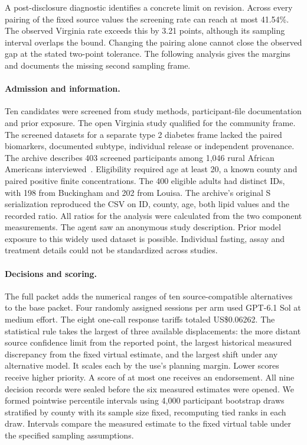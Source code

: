 A post-disclosure diagnostic identifies a concrete limit on revision. Across every pairing of the fixed source values the screening rate can reach at most 41.54\%. The observed Virginia rate exceeds this by 3.21 points, although its sampling interval overlaps the bound. Changing the pairing alone cannot close the observed gap at the stated two-point tolerance. The following analysis gives the margins and documents the missing second sampling frame.

\paragraph{Admission and information.}
Ten candidates were screened from study methods, participant-file documentation and prior exposure. The open Virginia study qualified for the community frame. The screened datasets for a separate type 2 diabetes frame lacked the paired biomarkers, documented subtype, individual release or independent provenance. The archive describes 403 screened participants among 1,046 rural African Americans interviewed~\cite{virginiadata,virginiastudy}. Eligibility required age at least 20, a known county and paired positive finite concentrations. The 400 eligible adults had distinct IDs, with 198 from Buckingham and 202 from Louisa. The archive's original S serialization reproduced the CSV on ID, county, age, both lipid values and the recorded ratio. All ratios for the analysis were calculated from the two component measurements. The agent saw an anonymous study description. Prior model exposure to this widely used dataset is possible. Individual fasting, assay and treatment details could not be standardized across studies.

\paragraph{Decisions and scoring.}
The full packet adds the numerical ranges of ten source-compatible alternatives to the base packet. Four randomly assigned sessions per arm used GPT-6.1 Sol at medium effort. The eight one-call response tariffs totaled US\$0.06262. The statistical rule takes the largest of three available displacements: the more distant source confidence limit from the reported point, the largest historical measured discrepancy from the fixed virtual estimate, and the largest shift under any alternative model. It scales each by the use's planning margin. Lower scores receive higher priority. A score of at most one receives an endorsement. All nine decision records were sealed before the six measured estimates were opened. We formed pointwise percentile intervals using 4,000 participant bootstrap draws stratified by county with its sample size fixed, recomputing tied ranks in each draw. Intervals compare the measured estimate to the fixed virtual table under the specified sampling assumptions.

